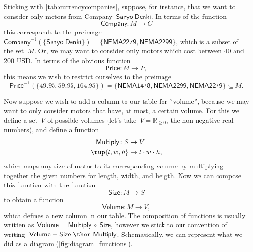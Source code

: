 Sticking with \cref{tab:currencycompanies}, suppose, for instance, that we want to consider only motors from Company~$\mathsf{Sanyo \ Denki}$. In terms of the function
\begin{equation*}
\mathsf{Company}\colon M \to C
\end{equation*}
this corresponds to the preimage~$\mathsf{Company}^{-1}(\{ \mathsf{Sanyo \ Denki} \}) = \{ \mathsf{NEMA2279}, \mathsf{NEMA2299}\}$, which is a subset of the set~$M$. Or, we may want to consider only motors which cost between 40 and 200 USD. In terms of the obvious function
\begin{equation*}
\mathsf{Price}\colon M \to P,
\end{equation*}
this means we wish to restrict ourselves to the preimage
\begin{equation*}
\mathsf{Price}^{-1}(\{ 49.95, 59.95, 164.95\}) = \{ \mathsf{NEMA1478}, \mathsf{NEMA2299}, \mathsf{NEMA2279} \} \subseteq M.
\end{equation*}

Now suppose we wish to add a column to our table for ``volume'', because we may want to only consider motors that have, at most, a certain volume. For this we define a set~$V$ of possible volumes (let's take~$V = \mathbb{R}_{\geq 0}$, the non-negative real numbers), and define a function
\begin{equation*}
\begin{aligned}
\mathsf{Multiply}\colon S &\to V\\
\tup{l, w, h} &\mapsto l \cdot w \cdot h,
\end{aligned}
\end{equation*}
which maps any size of motor to its corresponding volume by multiplying together the given numbers for length, width, and heigth.  Now we can compose this function with the function
\begin{equation*}
\mathsf{Size}\colon M \to S
\end{equation*}
to obtain a function
\begin{equation*}
\mathsf{Volume}\colon M \to V,
\end{equation*}
which defines a new column in our table. The composition of functions is usually written as~$\mathsf{Volume} = \mathsf{Multiply} \ \circ \ \mathsf{Size}$, however we stick to our convention of writing~$\mathsf{Volume} = \mathsf{Size} \ \then \ \mathsf{Multiply}$. Schematically, we can represent what we did as a diagram (\cref{fig:diagram_functions}).



